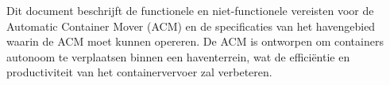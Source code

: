 Dit document beschrijft de functionele en niet-functionele vereisten voor de Automatic Container Mover (ACM) en de specificaties van het havengebied waarin de ACM moet kunnen opereren. De ACM is ontworpen om containers autonoom te verplaatsen binnen een haventerrein, wat de efficiëntie en productiviteit van het containervervoer zal verbeteren.
